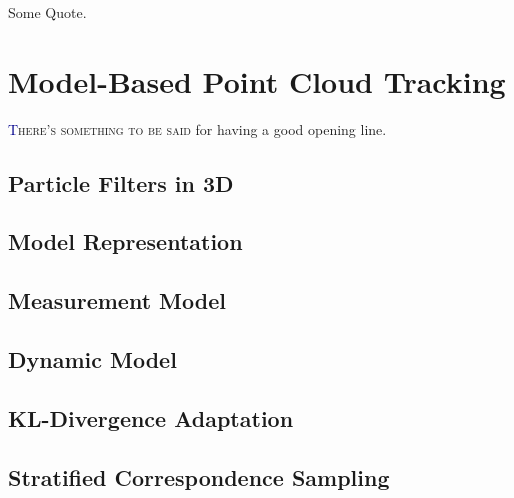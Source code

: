 \begin{savequote}[75mm]
Some Quote.
\end{savequote}

\chapter{Model-Based Point Cloud Tracking}
\label{Chap:ModelBasedTracking}
\lettrine[lines=3, loversize=0.3]{\textcolor{DarkBlue}T}{here's something to be said} for having a good opening line. 

\section{Particle Filters in 3D}
\section{Model Representation}
\section{Measurement Model}
\section{Dynamic Model}
\section{KL-Divergence Adaptation}
\section{Stratified Correspondence Sampling}
